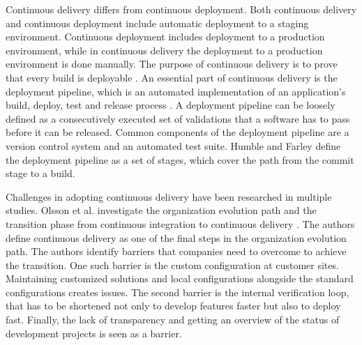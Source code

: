 \documentclass[lnbip]{svmultln}
\begin{document}

Continuous delivery differs from continuous deployment. Both continuous delivery and continuous deployment include automatic deployment to a staging environment. Continuous deployment includes deployment to a production environment, while in continuous delivery the deployment to a production environment is done manually. The purpose of continuous delivery is to prove that every build is deployable \cite{cdbook}. An essential part of continuous delivery is the deployment pipeline, which is an automated implementation of an application’s build, deploy, test and release process \cite{humble2006deployment}. A deployment pipeline can be loosely defined as a consecutively executed set of validations that a software has to pass before it can be released. Common components of the deployment pipeline are a version control system and an automated test suite. Humble and Farley define the deployment pipeline as a set of stages, which cover the path from the commit stage to a build.

Challenges in adopting continuous delivery have been researched in multiple studies. Olsson et al. investigate the organization evolution path and the transition phase from continuous integration to continuous delivery \cite{olsson2012climbing}.  The authors define continuous delivery as one of the final steps in the organization evolution path. The authors identify barriers that companies need to overcome to achieve the transition. One such barrier is the custom configuration at customer sites. Maintaining customized solutions and local configurations alongside the standard configurations creates issues. The second barrier is the internal verification loop, that has to be shortened not only to develop features faster but also to deploy fast. Finally, the lack of transparency and getting an overview of the status of development projects is seen as a barrier.
\end{document}
